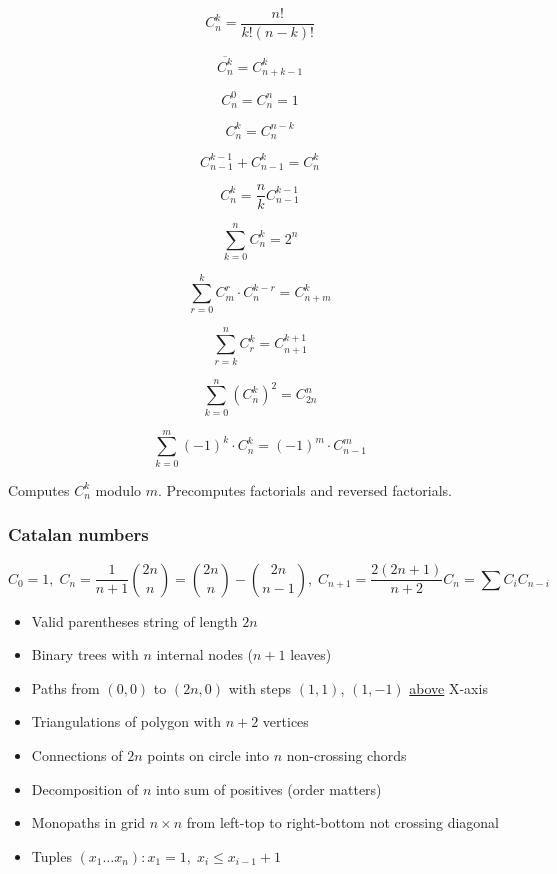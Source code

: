 \vspace{-1.5em}
\begin{multicols}{3}

  $$C_n^k = \frac{n!}{k!(n-k)!}$$

  $$\overline{C_n^k} = C_{n+k-1}^k$$

  $$C_n^0 = C_n^n = 1$$

  $$C_n^k = C_n^{n - k}$$

  $$C_{n - 1}^{k - 1} + C_{n - 1}^k = C_n^k$$

  $$C_n^k = \frac{n}{k} C_{n - 1}^{k - 1}$$

  $$\sum\limits_{k=0}^n C_n^k = 2^n$$

  $$\sum\limits_{r=0}^k C_m^r \cdot C_n^{k - r} = C_{n + m}^k$$

  $$\sum\limits_{r=k}^n C_r^k = C_{n+1}^{k+1}$$

  $$\sum\limits_{k=0}^n \left(C_n^k\right)^2 = C_{2n}^n$$

  $$\sum\limits_{k=0}^m (-1)^k \cdot C_n^k = (-1)^m \cdot C_{n - 1}^m$$

\end{multicols}

Computes $C_n^k$ modulo $m$. Precomputes factorials and reversed factorials. 

\subsubsection{Catalan numbers}

$$C_0 = 1,\; C_n = \frac1{n+1} \binom{2n}{n} = \binom{2n}{n} - \binom{2n}{n-1},\; C_{n+1}=\frac{2(2n+1)}{n+2}C_n = \sum C_i C_{n-i}$$

\begin{itemize}
  \item Valid parentheses string of length $2n$
  \item Binary trees with $n$ internal nodes ($n + 1$ leaves)
  \item Paths from $(0, 0)$ to $(2n, 0)$ with steps $(1, 1)$, $(1, -1)$ \ul{above} X-axis
  \item Triangulations of polygon with $n+2$ vertices
  \item Connections of $2n$ points on circle into $n$ non-crossing chords
  \item Decomposition of $n$ into sum of positives (order matters)
  \item Monopaths in grid $n\times n$ from left-top to right-bottom not crossing diagonal
  \item Tuples $(x_1 \ldots x_n): x_1 = 1,\; x_i \le x_{i - 1} + 1$
\end{itemize}

